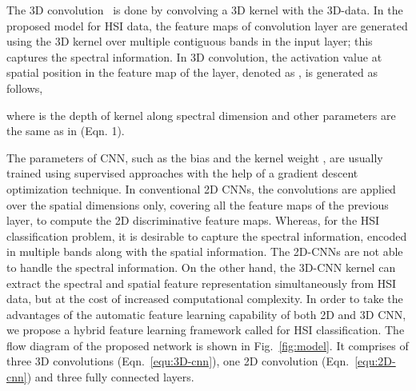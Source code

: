 \documentclass[journal]{IEEEtran}
\begin{document}
The 3D convolution~\cite{ji20133d} is done by convolving a 3D kernel with the 3D-data. In the proposed model for HSI data, the feature maps of convolution layer are generated using the 3D kernel over multiple contiguous bands in the input layer; this captures the spectral information. In 3D convolution, the activation value at spatial position  in the  feature map of the  layer, denoted as , is generated as follows,

where  is the depth of kernel along spectral dimension and other parameters are the same as in (Eqn. 1).

The parameters of CNN, such as the bias  and the kernel weight , are usually trained using supervised approaches \cite{krizhevsky2012imagenet} with the help of a gradient descent optimization technique. In conventional 2D CNNs, the convolutions are applied over the spatial dimensions only, covering all the feature maps of the previous layer, to compute the 2D discriminative feature maps. Whereas, for the HSI classification problem, it is desirable to capture the spectral information, encoded in multiple bands along with the spatial information. The 2D-CNNs are not able to handle the spectral information. On the other hand, the 3D-CNN kernel can extract the spectral and spatial feature representation simultaneously from HSI data, but at the cost of increased computational complexity. 
In order to take the advantages of the automatic feature learning capability of both 2D and 3D CNN, we propose a hybrid feature learning framework called  for HSI classification. The flow diagram of the proposed  network is shown in Fig.~\ref{fig:model}.
It comprises of three 3D convolutions (Eqn.~\ref{equ:3D-cnn}), one 2D convolution (Eqn.~\ref{equ:2D-cnn}) and three fully connected layers.
\end{document}
